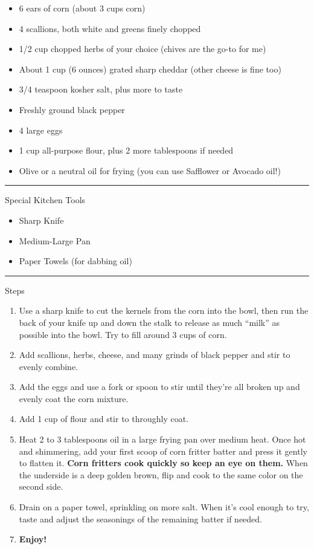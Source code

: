 \documentclass[]{article}
\providecommand{\tightlist}{%
  \setlength{\itemsep}{0pt}\setlength{\parskip}{0pt}}
\begin{document}
\begin{itemize}
\tightlist
\item
  6 ears of corn (about 3 cups corn)
\item
  4 scallions, both white and greens finely chopped
\item
  1/2 cup chopped herbs of your choice (chives are the go-to for me)
\item
  About 1 cup (6 ounces) grated sharp cheddar (other cheese is fine too)
\item
  3/4 teaspoon kosher salt, plus more to taste
\item
  Freshly ground black pepper
\item
  4 large eggs
\item
  1 cup all-purpose flour, plus 2 more tablespoons if needed
\item
  Olive or a neutral oil for frying (you can use Safflower or Avocado
  oil!)
\end{itemize}

\begin{center}\rule{0.5\linewidth}{\linethickness}\end{center}

Special Kitchen Tools

\begin{itemize}
\tightlist
\item
  Sharp Knife
\item
  Medium-Large Pan
\item
  Paper Towels (for dabbing oil)
\end{itemize}

\begin{center}\rule{0.5\linewidth}{\linethickness}\end{center}

Steps

\begin{enumerate}
\def\labelenumi{\arabic{enumi}.}
\tightlist
\item
  Use a sharp knife to cut the kernels from the corn into the bowl, then
  run the back of your knife up and down the stalk to release as much
  ``milk'' as possible into the bowl. Try to fill around 3 cups of corn.
\item
  Add scallions, herbs, cheese, and many grinds of black pepper and stir
  to evenly combine.
\item
  Add the eggs and use a fork or spoon to stir until they're all broken
  up and evenly coat the corn mixture.
\item
  Add 1 cup of flour and stir to throughly coat.
\item
  Heat 2 to 3 tablespoons oil in a large frying pan over medium heat.
  Once hot and shimmering, add your first scoop of corn fritter batter
  and press it gently to flatten it. \textbf{Corn fritters cook quickly
  so keep an eye on them.} When the underside is a deep golden brown,
  flip and cook to the same color on the second side.
\item
  Drain on a paper towel, sprinkling on more salt. When it's cool enough
  to try, taste and adjust the seasonings of the remaining batter if
  needed.
\item
  \textbf{Enjoy!}
\end{enumerate}
\end{document}
